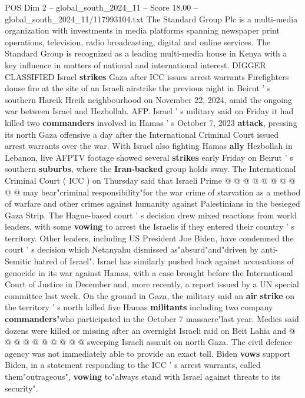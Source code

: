 \begin{textsample}{POS Dim 2 – global\_south\_2024\_11 – Score 18.00 – global\_south\_2024\_11/117993104.txt}  \label{ex:f2_pos_179}
The Standard Group Plc is a multi-media organization with investments in media platforms spanning newspaper print operations, television, radio broadcasting, digital and online services.
The Standard Group is recognized as a leading multi-media house in Kenya with a key influence in matters of national and international interest.
DIGGER CLASSIFIED Israel \textbf{strikes} Gaza after ICC issues arrest warrants Firefighters douse fire at the site of an Israeli airstrike the previous night in Beirut ' s southern Hareik Hreik neighbourhood on November 22, 2024, amid the ongoing war between Israel and Hezbollah.
AFP.
Israel ' s military said on Friday it had killed two \textbf{commanders} involved in Hamas ' s October 7, 2023 \textbf{attack}, pressing its north Gaza offensive a day after the International Criminal Court issued arrest warrants over the war.
With Israel also fighting Hamas \textbf{ally} Hezbollah in Lebanon, live AFPTV footage showed several \textbf{strikes} early Friday on Beirut ' s southern \textbf{suburbs}, where the \textbf{Iran-backed} group holds sway.
The International Criminal Court ( ICC ) on Thursday said that Israeli Prime @ @ @ @ @ @ @ @ @ @ may bear"criminal responsibility"for the war crime of starvation as a method of warfare and other crimes against humanity against Palestinians in the besieged Gaza Strip.
The Hague-based court ' s decision drew mixed reactions from world leaders, with some \textbf{vowing} to arrest the Israelis if they entered their country ' s territory.
Other leaders, including US President Joe Biden, have condemned the court ' s decision which Netanyahu dismissed as"absurd"and"driven by anti-Semitic hatred of Israel".
Israel has similarly pushed back against accusations of genocide in its war against Hamas, with a case brought before the International Court of Justice in December and, more recently, a report issued by a UN special committee last week.
On the ground in Gaza, the military said an \textbf{air} \textbf{strike} on the territory ' s north killed five Hamas \textbf{militants} including two company \textbf{commanders}"who participated in the October 7 massacre"last year.
Medics said dozens were killed or missing after an overnight Israeli raid on Beit Lahia and @ @ @ @ @ @ @ @ @ @ sweeping Israeli assault on north Gaza.
The civil defence agency was not immediately able to provide an exact toll.
Biden \textbf{vows} support Biden, in a statement responding to the ICC ' s arrest warrants, called them"outrageous", \textbf{vowing} to"always stand with Israel against threats to its security".

\end{textsample}
